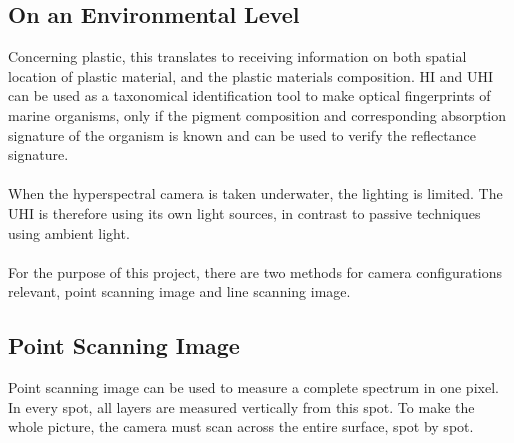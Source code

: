 \subsection{On an Environmental Level}
\noindent
Concerning plastic, this translates to receiving information on both spatial location of plastic material, and the plastic materials composition. 
%
%
\noindent
HI and UHI can be used as a taxonomical identification tool to make optical fingerprints of marine organisms, only if the pigment composition and corresponding absorption signature of the organism is known and can be used to verify the reflectance signature. \cite{pettersen_johnsen_bruheim_andreassen_2013}
\\\\
\noindent
When the hyperspectral camera is taken underwater, the lighting is limited. The UHI is therefore using its own light sources, in contrast to passive techniques using ambient light. \cite{johnsen_ludvigsen_sorensen_aas_2016}
\\\\
\noindent
For the purpose of this project, there are two methods for camera configurations relevant, point scanning image and line scanning image.
\subsection{Point Scanning Image}
Point scanning image can be used to measure a complete spectrum in one pixel. In every spot, all layers are measured vertically from this spot. To make the whole picture, the camera must scan across the entire surface, spot by spot. \cite{hia}




